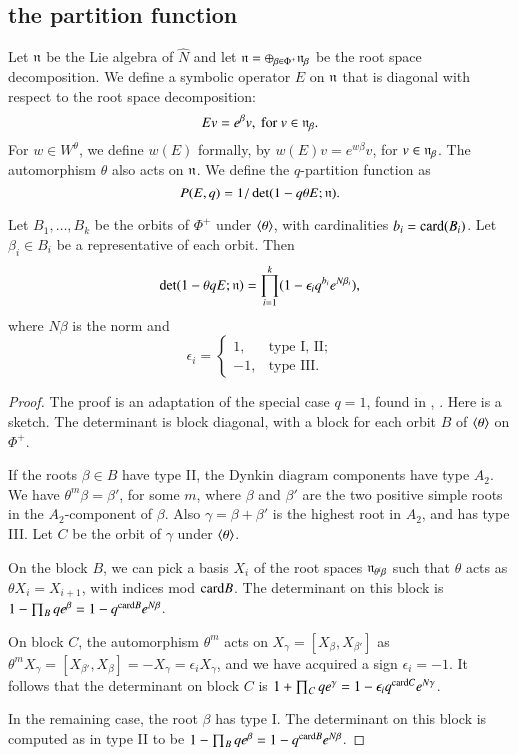 \subsection{the partition function}


Let ${\mathfrak n}$ be the Lie algebra of $\hat N$ and
let ${\mathfrak n} = \oplus_{\beta\in \Phi^+} {\mathfrak n}_\beta$ be the root space decomposition.  We define a symbolic operator $E$ on ${\mathfrak n}$ that is diagonal with
respect to the root space decomposition:
\[
E v = e^{\beta} v, \text{ for } v \in {\mathfrak n}_\beta.
\]
For $w\in W^\theta$, we define $w(E)$ formally, by $w(E) v = e^{ w \beta} v$, for $v\in {\mathfrak n}_\beta$.
The automorphism $\theta$ also acts on ${\mathfrak n}$.  We define the $q$-partition function as
\[
P(E,q) = 1/\det(1- q \theta E;{\mathfrak n}).
\]

\begin{lemma} \label{eqn:weyl-product}
Let $B_1,\ldots,B_k$ be the orbits of $\Phi^+$ under $\langle{\theta}\rangle$, with cardinalities $b_i = {\operatorname{card}}(B_i)$.
Let $\beta_i\in B_i$ be a representative of each orbit.
Then
\[
\det(1-\theta  q E;{\mathfrak n}) = \prod_{i=1}^k (1- \epsilon_i q^{b_i} e^{N\beta_i}),
\]
where 
$N\beta$ is the norm and
\[
\epsilon_i=\begin{cases} 1, & \text{type I, II};\\
     -1, & \text{type III}.
\end{cases}
\]
\end{lemma}

\begin{proof} The proof is an adaptation  of the special case $q=1$, 
found in \cite{jantzen1977darstellungen}, \cite{wendt2001weyl}.  Here is a sketch.
The determinant is block diagonal, with a block for each orbit $B$ of $\langle{\theta}\rangle$ on $\Phi^+$.

If the roots $\beta\in B$ have type II, the Dynkin diagram components have type $A_2$.
We have $\theta^m \beta = \beta'$, for some $m$, where $\beta$ and $\beta'$ are the two 
positive simple roots in the $A_2$-component of $\beta$.
Also $\gamma = \beta + \beta'$ is the highest root in $A_2$, and has type III.  
Let $C$ be the orbit of $\gamma$ under $\langle{\theta}\rangle$.  

On the block $B$, we can pick a basis $X_i$ of the
root spaces ${\mathfrak n}_{\theta^i\beta}$ such that $\theta$ acts as $\theta X_i = X_{i+1}$, with indices mod ${\operatorname{card}}{B}$.
The determinant on this block is $1- \prod_B {q e^{\beta}} = 1- q^{{\operatorname{card}} B} e^{N \beta}$.

On block $C$, the automorphism $\theta^m$ acts on $X_\gamma = [X_\beta,X_{\beta'}]$ 
as $\theta^m X_\gamma = [X_{\beta'},X_\beta] = -X_\gamma =\epsilon_i X_\gamma$, 
and we have acquired a sign $\epsilon_i=-1$.  
It follows that the determinant on block $C$
is $1+\prod_C {q e^\gamma} = 1-\epsilon_i q^{{\operatorname{card}} C} e^{N\gamma}$.

In the remaining case,  the root $\beta$ has type I.  
The determinant on this block is computed as in  type II to be $1- \prod_B q e^{\beta} = 1- q^{{\operatorname{card}}{B}} e^{N \beta}$.
\end{proof}


